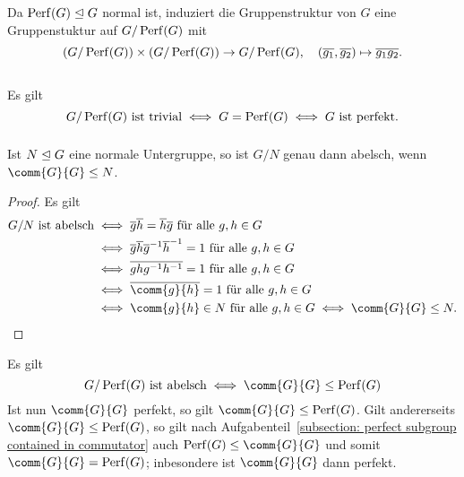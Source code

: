 \subsection{}

Da $\operatorname{Perf}(G) \trianglelefteq G$ normal ist, induziert die Gruppenstruktur von $G$ eine Gruppenstuktur auf $G/\operatorname{Perf}(G)$ mit
\[
          (G/\operatorname{Perf}(G)) \times (G/\operatorname{Perf}(G))
  \to     G/\operatorname{Perf}(G),
  \quad   (\overline{g_1}, \overline{g_2})
  \mapsto \overline{g_1 g_2}.
\]





\subsection{}



\subsubsection{}

Es gilt
\[
        \text{$G/\operatorname{Perf}(G)$ ist trivial}
  \iff  G = \operatorname{Perf}(G)
  \iff  \text{$G$ ist perfekt}.
\]



\subsubsection{}

\begin{lemma}
  Ist $N \trianglelefteq G$ eine normale Untergruppe, so ist $G/N$ genau dann abelsch, wenn $\comm{G}{G} \subgroup N$.
\end{lemma}

\begin{proof}
  Es gilt
  \begin{align*}
          \text{$G/N$ ist abelsch}
    &\iff \text{$\class{g} \class{h} = \class{h} \class{g}$ für alle $g, h \in G$}
    \\
    &\iff \text{$\class{g} \class{h} \class{g}^{-1} \class{h}^{-1} = 1$ für alle $g, h \in G$}
    \\
    &\iff \text{$\class{g h g^{-1} h^{-1}} = 1$ für alle $g, h \in G$}
    \\
    &\iff \text{$\class{\comm{g}{h}} = 1$ für alle $g, h \in G$}
    \\
    &\iff \text{$\comm{g}{h} \in N$ für alle $g, h \in G$}
     \iff \comm{G}{G} \subgroup N.
  \qedhere
  \end{align*}
\end{proof}

Es gilt
\[
        \text{$G/\Perf{G}$ ist abelsch}
  \iff  \comm{G}{G} \subgroup \Perf{G}
\]
Ist nun $\comm{G}{G}$ perfekt, so gilt  $\comm{G}{G} \subgroup \Perf{G}$.
Gilt andererseits $\comm{G}{G} \subgroup \Perf{G}$, so gilt nach Aufgabenteil~\ref{subsection: perfect subgroup contained in commutator} auch $\Perf{G} \subgroup \comm{G}{G}$ und somit $\comm{G}{G} = \Perf{G}$;
inbesondere ist $\comm{G}{G}$ dann perfekt.




